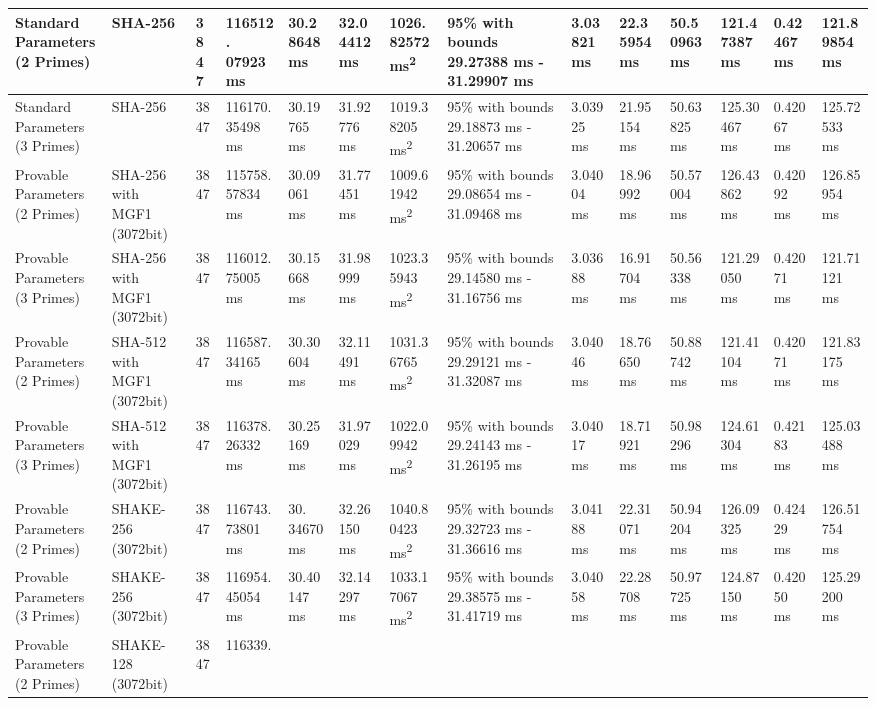 \documentclass[]{final_report}
\theoremstyle{definition}
\begin{document}
\begin{landscape}
\begin{longtable}{|p{2.3cm}|p{1.8cm}|p{1.0cm}|p{1.7cm}|p{1.2cm}|p{1.5cm}|p{1.8cm}|p{1.5cm}|p{1.2cm}|p{1.5cm}|p{1.3cm}|p{1.4cm}|p{1.3cm}|p{1.5cm}|}
Standard Parameters (2 Primes) & SHA-256 & 3847 & 116512.
07923 ms & 30.28648 ms & 32.04412 ms & 1026.82572 ms\textsuperscript{2} & 95\% with bounds 29.27388 ms - 31.29907 ms & 3.03821 ms & 22.35954 ms & 50.50963 ms & 121.47387 ms & 0.42467 ms & 121.89854 ms \\
\hline
Standard Parameters (3 Primes) & SHA-256 & 3847 & 116170.
35498 ms & 30.19765 ms & 31.92776 ms & 1019.38205 ms\textsuperscript{2} & 95\% with bounds 29.18873 ms - 31.20657 ms & 3.03925 ms & 21.95154 ms & 50.63825 ms & 125.30467 ms & 0.42067 ms & 125.72533 ms \\
\hline
Provable Parameters (2 Primes) & SHA-256 with MGF1 (3072bit) & 3847 & 115758.
57834 ms & 30.09061 ms & 31.77451 ms & 1009.61942 ms\textsuperscript{2} & 95\% with bounds 29.08654 ms - 31.09468 ms & 3.04004 ms & 18.96992 ms & 50.57004 ms & 126.43862 ms & 0.42092 ms & 126.85954 ms \\
\hline
Provable Parameters (3 Primes) & SHA-256 with MGF1 (3072bit) & 3847 & 116012.
75005 ms & 30.15668 ms & 31.98999 ms & 1023.35943 ms\textsuperscript{2} & 95\% with bounds 29.14580 ms - 31.16756 ms & 3.03688 ms & 16.91704 ms & 50.56338 ms & 121.29050 ms & 0.42071 ms & 121.71121 ms \\
\hline
Provable Parameters (2 Primes) & SHA-512 with MGF1 (3072bit) & 3847 & 116587.
34165 ms & 30.30604 ms & 32.11491 ms & 1031.36765 ms\textsuperscript{2} & 95\% with bounds 29.29121 ms - 31.32087 ms & 3.04046 ms & 18.76650 ms & 50.88742 ms & 121.41104 ms & 0.42071 ms & 121.83175 ms \\
\hline
Provable Parameters (3 Primes) & SHA-512 with MGF1 (3072bit) & 3847 & 116378.
26332 ms & 30.25169 ms & 31.97029 ms & 1022.09942 ms\textsuperscript{2} & 95\% with bounds 29.24143 ms - 31.26195 ms & 3.04017 ms & 18.71921 ms & 50.98296 ms & 124.61304 ms & 0.42183 ms & 125.03488 ms \\
\hline
Provable Parameters (2 Primes) & SHAKE-256 (3072bit) & 3847 & 116743.73801 ms & 30.
34670 ms & 32.26150 ms & 1040.80423 ms\textsuperscript{2} & 95\% with bounds 29.32723 ms - 31.36616 ms & 3.04188 ms & 22.31071 ms & 50.94204 ms & 126.09325 ms & 0.42429 ms & 126.51754 ms \\
\hline
Provable Parameters (3 Primes) & SHAKE-256 (3072bit) & 3847 & 116954.
45054 ms & 30.40147 ms & 32.14297 ms & 1033.17067 ms\textsuperscript{2} & 95\% with bounds 29.38575 ms - 31.41719 ms & 3.04058 ms & 22.28708 ms & 50.97725 ms & 124.87150 ms & 0.42050 ms & 125.29200 ms \\
\hline
Provable Parameters (2 Primes) & SHAKE-128 (3072bit) & 3847 & 116339.

\end{longtable}
\end{landscape}
\end{document}
